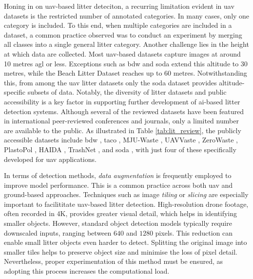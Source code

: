 Honing in on \gls{uav}-based litter deteciton, a recurring limitation evident in \gls{uav} datasets is the restricted number of annotated categories. In many cases, only one category is included. To this end, when multiple categories are included in a dataset, a common practice observed was to conduct an experiment by merging all classes into a single general litter category. Another challenge lies in the height at which data are collected. Most \gls{uav}-based datasets capture images at around 10 metres \gls{agl} or less. Exceptions such as \gls{bdw} \cite{bdwdataset} and \gls{soda} \cite{soda_dataset} extend this altitude to 30 metres, while the Beach Litter Dataset \cite{beach_litter} reaches up to 60 metres. Notwithstanding this, from among the \gls{uav} litter datasets only the \gls{soda} dataset \cite{soda_dataset} provides altitude-specific subsets of data.
Notably, the diversity of litter datasets and public accessibility is a key factor in supporting further development of \gls{ai}-based litter detection systems. Although several of the reviewed datasets have been featured in international peer-reviewed conferences and journals, only a limited number are available to the public. As illustrated in Table \ref{tab:lit_review}, the publicly accessible datasets include \gls{bdw} \cite{bdwdataset}, \gls{taco} \cite{taco2020}, MJU-Waste \cite{mju_waste}, UAVVaste \cite{uavvaste}, ZeroWaste \cite{zerowaste}, PlastoPol \cite{plastopol}, HAIDA \cite{haida}, TrashNet \cite{trashnet}, and \gls{soda} \cite{soda_dataset}, with just four of these specifically developed for \gls{uav} applications.

In terms of detection methods, \textit{data augmentation} is frequently employed to improve model performance. This is a common practice across both \gls{uav} and ground-based approaches. Techniques such as image \textit{tiling} or \textit{slicing} are especially important to facilititate \gls{uav}-based litter detection. High-resolution drone footage, often recorded in 4K, provides greater visual detail, which helps in identifying smaller objects. However, standard object detection models typically require downscaled inputs, ranging between $640$ and $1280$ pixels. This reduction can enable small litter objects even harder to detect. Splitting the original image into smaller tiles helps to preserve object size and minimise the loss of pixel detail. Nevertheless, proper experimentation of this method must be ensured, as adopting this process increases the computational load.

